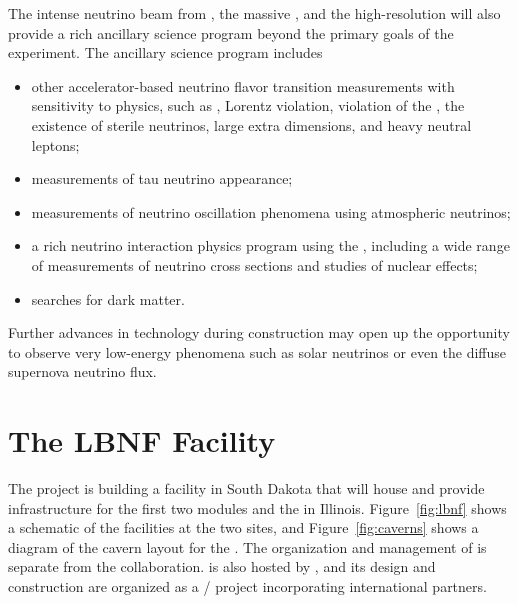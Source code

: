 The intense neutrino beam from , the massive   , and the high-resolution
  will also provide a rich ancillary science program beyond the primary goals of the experiment. The ancillary science program includes
\begin{itemize}
     \item other accelerator-based neutrino flavor transition measurements with sensitivity to  physics, such as , Lorentz violation,  violation of the , the existence of sterile neutrinos, large extra dimensions, and heavy neutral leptons;
     \item measurements of tau neutrino appearance;
     \item measurements of neutrino oscillation phenomena using atmospheric neutrinos;
     \item a rich neutrino interaction physics program using the  , including a wide range of measurements of neutrino cross sections and studies of nuclear effects; 
     \item  searches for dark matter.
\end{itemize} 
Further advances in  
technology during   construction may open up the opportunity
to observe very low-energy phenomena such as solar neutrinos or even the diffuse supernova neutrino flux.


\section{The LBNF Facility} 

The  project is building a facility in South Dakota that will house and provide infrastructure for the first two   modules and the  in Illinois.  Figure~\ref{fig:lbnf} shows
a schematic of the facilities at the two sites, and Figure~\ref{fig:caverns} shows a diagram of the cavern layout for the .  
The organization and management of  is separate from the  collaboration.  is also hosted by , and its design and construction are organized as a / project incorporating international partners. 


